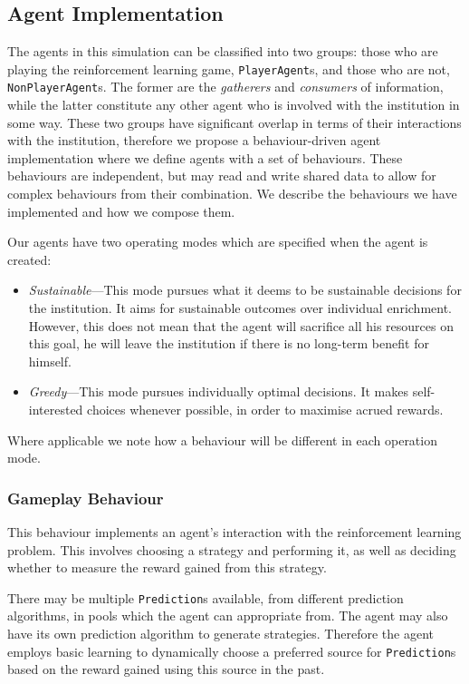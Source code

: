 \subsection{Agent Implementation}

The agents in this simulation can be classified into two groups: those who are
playing the reinforcement learning game, \texttt{PlayerAgent}s, and those who
are not, \texttt{NonPlayerAgent}s. The former are the \emph{gatherers} and
\emph{consumers} of information, while the latter constitute any other agent
who is involved with the institution in some way. These two groups have
significant overlap in terms of their interactions with the institution,
therefore we propose a behaviour-driven agent implementation where we define
agents with a set of behaviours. These behaviours are independent, but may
read and write shared data to allow for complex behaviours from their
combination. We describe the behaviours we have implemented and how we compose
them.

Our agents have two operating modes which are specified when the agent is created:

\begin{itemize}
\item \emph{Sustainable}---This mode pursues what it deems to be sustainable decisions for the institution. It aims for sustainable outcomes over individual enrichment. However, this does not mean that the agent will sacrifice all his resources on this goal, he will leave the institution if there is no long-term benefit for himself.
\item \emph{Greedy}---This mode pursues individually optimal decisions. It makes self-interested choices whenever possible, in order to maximise acrued rewards.
\end{itemize}

Where applicable we note how a behaviour will be different in each operation mode.

\subsubsection*{Gameplay Behaviour}

This behaviour implements an agent's interaction with the reinforcement
learning problem. This involves choosing a strategy and performing it, as well
as deciding whether to measure the reward gained from this strategy.

There may be multiple \texttt{Prediction}s available, from different
prediction algorithms, in pools which the agent can appropriate from. The
agent may also have its own prediction algorithm to generate strategies.
Therefore the agent employs basic learning to dynamically choose a preferred
source for \texttt{Prediction}s based on the reward gained using this source
in the past.

